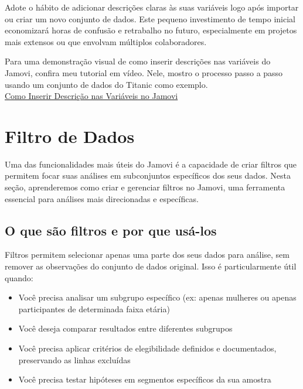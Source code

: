 Adote o hábito de adicionar descrições claras às suas variáveis logo após importar ou criar um novo conjunto de dados. Este pequeno investimento de tempo inicial economizará horas de confusão e retrabalho no futuro, especialmente em projetos mais extensos ou que envolvam múltiplos colaboradores.

\begin{tcolorbox}[colback=white,colframe=red,title={\faPlayCircle \ Dica de Conteúdo}]
  Para uma demonstração visual de como inserir descrições nas variáveis do Jamovi, confira meu tutorial em vídeo. Nele, mostro o processo passo a passo usando um conjunto de dados do Titanic como exemplo.\\
  \textcolor{red}{\faYoutube} \href{https://youtu.be/00HUaQaRt_E?si=JdYJKYGYpf6Orlox}{Como Inserir Descrição nas Variáveis no Jamovi}
\end{tcolorbox}

\section{Filtro de Dados}

Uma das funcionalidades mais úteis do Jamovi é a capacidade de criar filtros que permitem focar suas análises em subconjuntos específicos dos seus dados. Nesta seção, aprenderemos como criar e gerenciar filtros no Jamovi, uma ferramenta essencial para análises mais direcionadas e específicas.

\subsection{O que são filtros e por que usá-los}

Filtros permitem selecionar apenas uma parte dos seus dados para análise, sem remover as observações do conjunto de dados original. Isso é particularmente útil quando:

\begin{itemize}
    \item Você precisa analisar um subgrupo específico (ex: apenas mulheres ou apenas participantes de determinada faixa etária)
    \item Você deseja comparar resultados entre diferentes subgrupos
    \item Você precisa aplicar critérios de elegibilidade definidos e documentados, preservando as linhas excluídas
    \item Você precisa testar hipóteses em segmentos específicos da sua amostra
\end{itemize}

